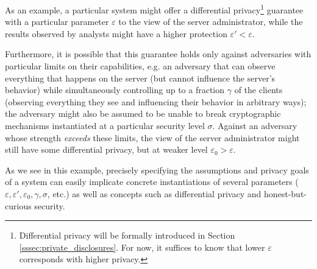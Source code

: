 As an example, a particular system might offer a differential privacy\footnote{Differential privacy will be formally introduced in Section \ref{sssec:private_disclosures}.  For now, it suffices to know that lower $\varepsilon$ corresponds with higher privacy.} guarantee with a particular parameter $\varepsilon$ to the view of the server administrator, while the results observed by analysts might have a higher protection $\varepsilon' < \varepsilon$. 

Furthermore, it is possible that this guarantee holds only against adversaries with particular limits on their capabilities, e.g. an adversary that can observe everything that happens on the server (but cannot influence the server's behavior) while simultaneously controlling up to a fraction $\gamma$ of the clients (observing everything they see and influencing their behavior in arbitrary ways); the adversary might also be assumed to be unable to break cryptographic mechanisms instantiated at a particular security level $\sigma$.  Against an adversary whose strength \textit{exceeds} these limits, the view of the server administrator might still have some differential privacy, but at weaker level $\varepsilon_0 > \varepsilon$.  

As we see in this example, precisely specifying the assumptions and privacy goals of a system can easily implicate concrete instantiations of several parameters ($\varepsilon, \varepsilon', \varepsilon_0, \gamma, \sigma$, etc.) as well as concepts such as differential privacy and honest-but-curious security.

